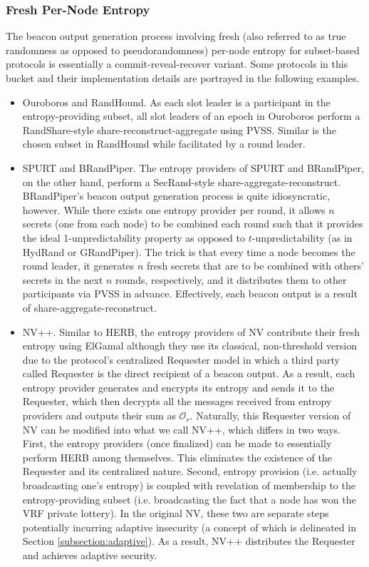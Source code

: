 \documentclass[letterpaper,twocolumn,10pt]{article}
\theoremstyle{definition}
\theoremstyle{remark}
\begin{document}
\subsubsection{Fresh Per-Node Entropy}
\label{subsubsection:fresh}
The beacon output generation process involving fresh (also referred to as true randomness \cite{cascudomt, das2021spurt} as opposed to pseudorandomness) per-node entropy for subset-based protocols is essentially a commit-reveal-recover variant. Some protocols in this bucket and their implementation details are portrayed in the following examples.
\begin{itemize}
\item Ouroboros and RandHound. As each slot leader is a participant in the entropy-providing subset, all slot leaders of an epoch in Ouroboros perform a RandShare-style share-reconstruct-aggregate using PVSS. Similar is the chosen subset in RandHound while facilitated by a round leader.
\item SPURT and BRandPiper. The entropy providers of SPURT and BRandPiper, on the other hand, perform a SecRand-style share-aggregate-reconstruct. BRandPiper's beacon output generation process is quite idiosyncratic, however. While there exists one entropy provider per round, it allows $n$ secrets (one from each node) to be combined each round such that it provides the ideal 1-unpredictability property as opposed to $t$-unpredictability (as in HydRand or GRandPiper). The trick is that every time a node becomes the round leader, it generates $n$ fresh secrets that are to be combined with others' secrets in the next $n$ rounds, respectively, and it distributes them to other participants via PVSS in advance. Effectively, each beacon output is a result of share-aggregate-reconstruct.
\item NV++. Similar to HERB, the entropy providers of NV \cite{nguyen2019scalable} contribute their fresh entropy using ElGamal although they use its classical, non-threshold version due to the protocol's centralized Requester model in which a third party called Requester is the direct recipient of a beacon output. As a result, each entropy provider generates and encrypts its entropy and sends it to the Requester, which then decrypts all the messages received from entropy providers and outputs their sum as $\mathcal{O}_r$. Naturally, this Requester version of NV can be modified into what we call NV++, which differs in two ways. First, the entropy providers (once finalized) can be made to essentially perform HERB among themselves. This eliminates the existence of the Requester and its centralized nature. Second, entropy provision (i.e. actually broadcasting one's entropy) is coupled with revelation of membership to the entropy-providing subset (i.e. broadcasting the fact that a node has won the VRF private lottery). In the original NV, these two are separate steps potentially incurring adaptive insecurity (a concept of which is delineated in Section \ref{subsection:adaptive}). As a result, NV++ distributes the Requester and achieves adaptive security.
\end{itemize}
\end{document}

